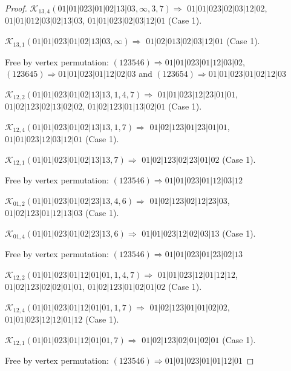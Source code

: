 \documentclass[12pt]{article}
\theoremstyle{plain}
\theoremstyle{definition}
\theoremstyle{remark}
\newcommand{\fancy}[1]{\mathcal{#1}}
\def\K{\fancy{K}}
\begin{document}
\begin{proof}
	$\K_{13,4}(01|01|023|01|02|13|03,\infty,3, 7)\Rightarrow $ $01|01|023|02|03|12|02$, $01|01|012|03|02|13|03$, $01|01|023|02|03|12|01$ (Case 1).
	
	$\K_{13,1}(01|01|023|01|02|13|03,\infty)\Rightarrow $ $01|02|013|02|03|12|01$ (Case 1).
	
	
	
	Free by vertex permutation: $(1 2 3 5 4 6)\Rightarrow 01|01|023|01|12|03|02$, $(1 2 3 6 4 5)\Rightarrow 01|01|023|01|12|02|03$ and $(1 2 3 6 5 4)\Rightarrow 01|01|023|01|02|12|03$
	
	
	
	\bigskip
	
	$\K_{12,2}(01|01|023|01|02|13|13,1, 4, 7)\Rightarrow $ $01|01|023|12|23|01|01$, $01|02|123|02|13|02|02$, $01|02|123|01|13|02|01$ (Case 1).
	
	$\K_{12,4}(01|01|023|01|02|13|13,1, 7)\Rightarrow $ $01|02|123|01|23|01|01$, $01|01|023|12|03|12|01$ (Case 1).
	
	$\K_{12,1}(01|01|023|01|02|13|13,7)\Rightarrow $ $01|02|123|02|23|01|02$ (Case 1).
	
	
	
	Free by vertex permutation: $(1 2 3 5 4 6)\Rightarrow 01|01|023|01|12|03|12$
	
	
	
	\bigskip
	
	$\K_{01,2}(01|01|023|01|02|23|13,4, 6)\Rightarrow $ $01|02|123|02|12|23|03$, $01|02|123|01|12|13|03$ (Case 1).
	
	$\K_{01,4}(01|01|023|01|02|23|13,6)\Rightarrow $ $01|01|023|12|02|03|13$ (Case 1).
	
	
	
	Free by vertex permutation: $(1 2 3 5 4 6)\Rightarrow 01|01|023|01|23|02|13$
	
	
	
	\bigskip
	
	$\K_{12,2}(01|01|023|01|12|01|01,1, 4, 7)\Rightarrow $ $01|01|023|12|01|12|12$, $01|02|123|02|02|01|01$, $01|02|123|01|02|01|02$ (Case 1).
	
	$\K_{12,4}(01|01|023|01|12|01|01,1, 7)\Rightarrow $ $01|02|123|01|01|02|02$, $01|01|023|12|12|01|12$ (Case 1).
	
	$\K_{12,1}(01|01|023|01|12|01|01,7)\Rightarrow $ $01|02|123|02|01|02|01$ (Case 1).
	
	
	
	Free by vertex permutation: $(1 2 3 5 4 6)\Rightarrow 01|01|023|01|01|12|01$
	
	
	

\end{proof}
\end{document}
